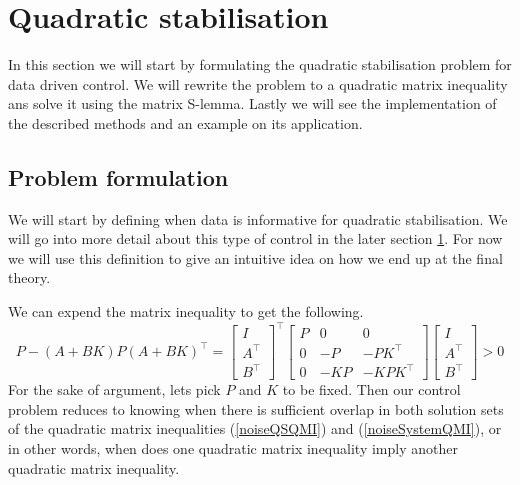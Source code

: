 \section{Quadratic stabilisation} \label{SectionQuadStab}
In this section we will start by formulating the quadratic stabilisation problem for data driven control. We will rewrite the problem to a quadratic matrix inequality ans solve it using the matrix S-lemma. Lastly we will see the implementation of the described methods and an example on its application.

\subsection{Problem formulation}
We will start by defining when data is informative for quadratic stabilisation. We will go into more detail about this type of control in the later section \ref{SectionQuadStab}. For now we will use this definition to give an intuitive idea on how we end up at the final theory.


We can expend the matrix inequality to get the following.
\begin{equation} \label{noiseQSQMI}
P - (A + BK) P (A + BK)^\top = 
\begin{bmatrix} I\\A^\top\\B^\top \end{bmatrix}^\top 
\begin{bmatrix} P&0&0\\0&-P&-PK^\top\\0&-KP&-KPK^\top \end{bmatrix} 
\begin{bmatrix} I\\A^\top\\B^\top \end{bmatrix} > 0
\end{equation}
For the sake of argument, lets pick $P$ and $K$ to be fixed. Then our control problem reduces to knowing when there is sufficient overlap in both solution sets of the quadratic matrix inequalities (\ref{noiseQSQMI}) and (\ref{noiseSystemQMI}), or in other words, when does one quadratic matrix inequality imply another quadratic matrix inequality.


